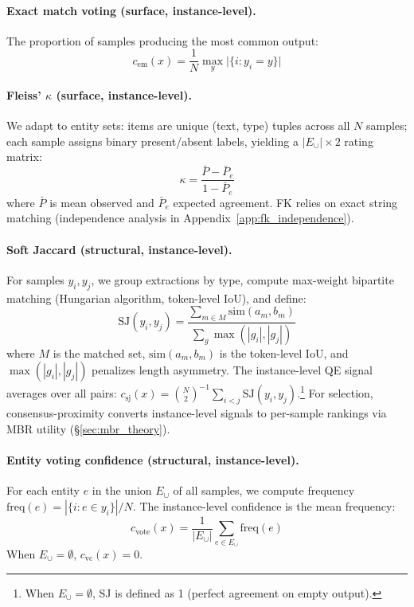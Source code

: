 \paragraph{Exact match voting (surface, instance-level).}
The proportion of samples producing the most common output:
\begin{equation}\label{eq:em}
c_{\text{em}}(x) = \frac{1}{N} \max_{y} \big|\{i : y_i = y\}\big|
\end{equation}

\paragraph{Fleiss' $\kappa$ (surface, instance-level).}
We adapt \citet{fleiss1971agreement} to entity sets: items are unique (text, type) tuples across all $N$ samples; each sample assigns binary present/absent labels, yielding a $|E_\cup| \times 2$ rating matrix:
\begin{equation}\label{eq:fk}
\kappa = \frac{\bar{P} - \bar{P}_e}{1 - \bar{P}_e}
\end{equation}
where $\bar{P}$ is mean observed and $\bar{P}_e$ expected agreement.
FK relies on exact string matching (independence analysis in Appendix~\ref{app:fk_independence}).

\paragraph{Soft Jaccard (structural, instance-level).}
For samples $y_i, y_j$, we group extractions by type, compute max-weight bipartite matching (Hungarian algorithm, token-level IoU), and define:
\begin{equation}\label{eq:sj}
\text{SJ}(y_i, y_j) = \frac{\sum_{m \in M} \text{sim}(a_m, b_m)}{\sum_{g} \max(|g_i|, |g_j|)}
\end{equation}
where $M$ is the matched set, $\text{sim}(a_m, b_m)$ is the token-level IoU, and $\max(|g_i|, |g_j|)$ penalizes length asymmetry.
The instance-level QE signal averages over all pairs: $c_{\text{sj}}(x) = \binom{N}{2}^{-1} \sum_{i<j} \text{SJ}(y_i, y_j)$.\footnote{When $E_\cup = \emptyset$, SJ is defined as 1 (perfect agreement on empty output).}
For selection, consensus-proximity converts instance-level signals to per-sample rankings via MBR utility (\S\ref{sec:mbr_theory}).

\paragraph{Entity voting confidence (structural, instance-level).}
For each entity $e$ in the union $E_\cup$ of all samples, we compute frequency $\text{freq}(e) = |\{i : e \in y_i\}| / N$.
The instance-level confidence is the mean frequency:
\begin{equation}\label{eq:voting}
c_{\text{vote}}(x) = \frac{1}{|E_\cup|} \sum_{e \in E_\cup} \text{freq}(e)
\end{equation}
When $E_\cup = \emptyset$, $c_{\mathrm{vc}}(x) = 0$.


